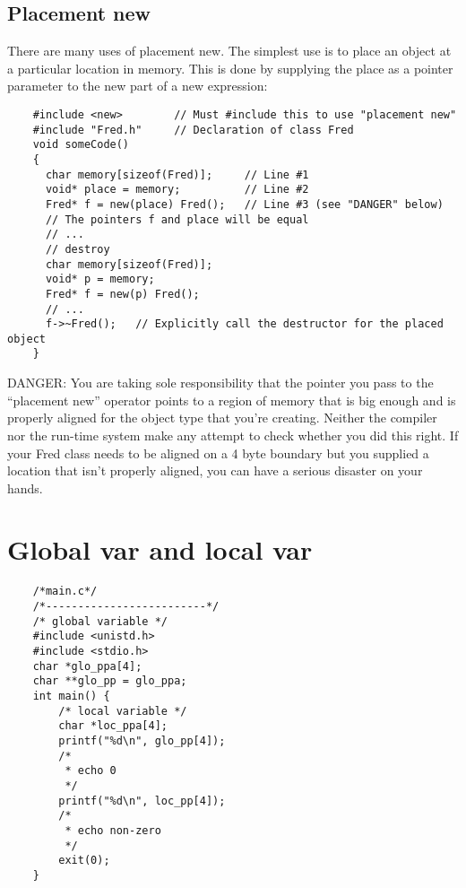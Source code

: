 \documentclass[11pt,a4paper]{article}
\begin{document}
    \subsection{\textsf{Placement new}}
    There are many uses of placement new. The simplest use is to place an object at a particular location in memory. This is done by supplying the place as a pointer parameter to the new part of a new expression:\\
    \begin{lstlisting}
	#include <new>        // Must #include this to use "placement new"
	#include "Fred.h"     // Declaration of class Fred
	void someCode()
	{
	  char memory[sizeof(Fred)];     // Line #1
	  void* place = memory;          // Line #2
	  Fred* f = new(place) Fred();   // Line #3 (see "DANGER" below)
	  // The pointers f and place will be equal
	  // ...
      // destroy
	  char memory[sizeof(Fred)];
	  void* p = memory;
	  Fred* f = new(p) Fred();
	  // ...
	  f->~Fred();   // Explicitly call the destructor for the placed object
	}
    \end{lstlisting}
    DANGER: You are taking sole responsibility that the pointer you pass to the “placement new” operator points to a region of memory that is big enough and is properly aligned for the object type that you’re creating. Neither the compiler nor the run-time system make any attempt to check whether you did this right. If your Fred class needs to be aligned on a 4 byte boundary but you supplied a location that isn’t properly aligned, you can have a serious disaster on your hands.
    \section{Global var and local var} 
    \begin{lstlisting}
    /*main.c*/
    /*-------------------------*/
    /* global variable */
    #include <unistd.h>
    #include <stdio.h>
    char *glo_ppa[4];
    char **glo_pp = glo_ppa;
    int main() {
        /* local variable */
        char *loc_ppa[4];
        printf("%d\n", glo_pp[4]);
        /* 
         * echo 0
         */
        printf("%d\n", loc_pp[4]);
        /* 
         * echo non-zero
         */
        exit(0);
    }

    \end{lstlisting}
\end{document}
